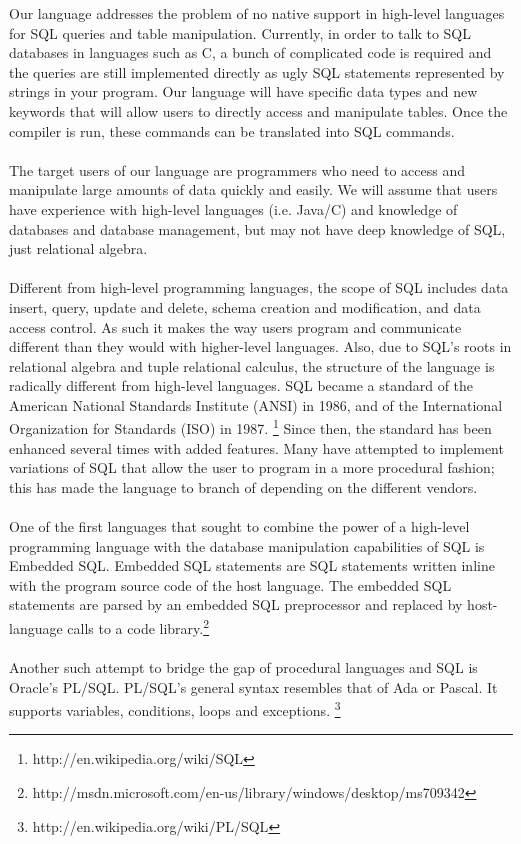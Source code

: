 \documentclass[11pt]{report}
\begin{document}
Our language addresses the problem of no native support in high-level languages for SQL queries and table manipulation. Currently, in order to talk to SQL databases in languages such as C, a bunch of complicated code is required and the queries are still implemented directly as ugly SQL statements represented by strings in your program. Our language will have specific data types and new keywords that will allow users to directly access and manipulate tables. Once the compiler is run, these commands can be translated into SQL commands.\\
\\
The target users of our language are programmers who need to access and manipulate large amounts of data quickly and easily. We will assume that users have experience with high-level languages (i.e. Java/C) and knowledge of databases and database management, but may not have deep knowledge of SQL, just relational algebra.\\
\\
Different from high-level programming languages, the scope of SQL includes data insert, query, update and delete, schema creation and modification, and data access control. As such it makes the way users program and communicate different than they would with higher-level languages. Also, due to SQL’s roots in relational algebra and tuple relational calculus, the structure of the language is radically different from high-level languages. SQL became a standard of the American National Standards Institute (ANSI) in 1986, and of the International Organization for Standards (ISO) in 1987. \footnote{http://en.wikipedia.org/wiki/SQL} Since then, the standard has been enhanced several times with added features. Many have attempted to implement variations of SQL that allow the user to program in a more procedural fashion; this has made the language to branch of depending on the different vendors.\\
\\
One of the first languages that sought to combine the power of a high-level programming language with the database manipulation capabilities of SQL is Embedded SQL. Embedded SQL statements are SQL statements written inline with the program source code of the host language. The embedded SQL statements are parsed by an embedded SQL preprocessor and replaced by host-language calls to a code library.\footnote{http://msdn.microsoft.com/en-us/library/windows/desktop/ms709342}
\\
\\
Another such attempt to bridge the gap of procedural languages and SQL is Oracle’s PL/SQL. PL/SQL’s general syntax resembles that of Ada or Pascal. It supports variables, conditions, loops and exceptions. \footnote{http://en.wikipedia.org/wiki/PL/SQL} \\
\end{document}
